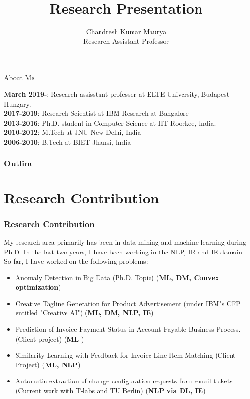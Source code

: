 \documentclass[blue]{beamer}
\title{Research Presentation}
\author[Chandresh]{Chandresh Kumar Maurya \\ Research Assistant Professor\\ }
\institute{E\"otv\"os Lor\'and University, Budapest, Hungary}
\begin{document}
\maketitle

\begin{frame}{About Me}

{\bf March 2019-}: Research assisstant professor at ELTE University, Budapest Hungary.\\
{\bf 2017-2019}:  Research Scientist at IBM Research at Bangalore\\
{\bf 2013-2016}:  Ph.D. student in Computer Science at IIT Roorkee, India. \\
{\bf 2010-2012}: M.Tech at JNU New Delhi, India\\
{\bf 2006-2010}: B.Tech at BIET Jhansi, India\\
\end{frame}

\begin{frame}
\frametitle{Outline}
  \tableofcontents %
\end{frame}


\section{Research Contribution}

\begin{frame}
\frametitle{Research Contribution}
My research area primarily has been in data mining and machine learning during Ph.D.  In the last two years, I have been working in the NLP, IR and IE domain. 
So far, I have worked on the following problems:
\begin{itemize}
\item Anomaly Detection in Big Data (Ph.D. Topic) ({\bf ML, DM, Convex optimization})
\item Creative Tagline Generation for Product Advertisement (under IBM"s CFP entitled "Creative AI") ({\bf ML, DM, NLP, IE})
\item Prediction of Invoice Payment Status in Account Payable Business Process. (Client project) ({\bf ML })
\item Similarity Learning with Feedback for Invoice Line Item Matching (Client Project) ({\bf  ML, NLP})
\item  Automatic extraction of change configuration requests from email tickets (Current work with T-labs and TU Berlin) ({\bf NLP via DL, IE})
\end{itemize}


\end{frame}
\end{document}
